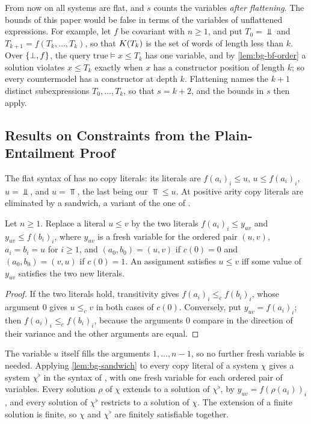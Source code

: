 From now on all systems are flat, and $s$ counts the variables \emph{after
flattening}. The bounds of this paper would be false in terms of the variables
of unflattened expressions. For example, let $f$ be covariant with $n\ge1$, and
put $T_0=\Bot$ and $T_{k+1}=f(T_k,\ldots,T_k)$, so that $K(T_k)$ is the set
of words of length less than $k$. Over $\{\bot,f\}$, the query $\mathrm{true}\models
x\le T_k$ has one variable, and by \cref{lem:bg-bf-order} a solution violates
$x\le T_k$ exactly when $x$ has a constructor position of length $k$; so every
countermodel has a constructor at depth $k$. Flattening names the $k+1$ distinct
subexpressions $T_0,\ldots,T_k$, so that $s=k+2$, and the bounds in $s$ then
apply.

\subsection{Results on Constraints from the Plain-Entailment Proof}\label{sec:bg-nsse}

The flat syntax of \citet{Zhao26} has no copy literals: its literals are
$f(a_i)_i\le u$, $u\le f(a_i)_i$, $u=\Bot$, and $u=\Top$, the last being our
$\Top\le u$. At positive arity copy literals are eliminated by a sandwich, a
variant of the one of .

\begin{lemma}\label{lem:bg-sandwich}
Let $n\ge1$. Replace a literal $u\le v$ by the two literals
$f(a_i)_i\le y_{uv}$ and $y_{uv}\le f(b_i)_i$, where $y_{uv}$ is a fresh
variable for the ordered pair $(u,v)$, $a_i=b_i=u$ for $i\ge1$, and
$(a_0,b_0)=(u,v)$ if $c(0)=0$ and $(a_0,b_0)=(v,u)$ if $c(0)=1$. An assignment
satisfies $u\le v$ iff some value of $y_{uv}$ satisfies the two new literals.
\end{lemma}
\begin{proof}
If the two literals hold, transitivity gives $f(a_i)_i\le_c f(b_i)_i$, whose
argument $0$ gives $u\le_c v$ in both cases of $c(0)$. Conversely, put
$y_{uv}=f(a_i)_i$; then $f(a_i)_i\le_c f(b_i)_i$, because the arguments $0$
compare in the direction of their variance and the other arguments are equal.
\end{proof}

The variable $u$ itself fills the arguments $1,\ldots,n-1$, so no further fresh
variable is needed. Applying \cref{lem:bg-sandwich} to every copy literal of a
system $\chi$ gives a system $\chi^\flat$ in the syntax of \citet{Zhao26}, with
one fresh variable for each ordered pair of variables. Every solution $\rho$ of
$\chi$ extends to a solution of $\chi^\flat$, by $y_{uv}=f(\rho(a_i))_i$, and
every solution of $\chi^\flat$ restricts to a solution of $\chi$. The extension
of a finite solution is finite, so $\chi$ and $\chi^\flat$ are finitely
satisfiable together.

